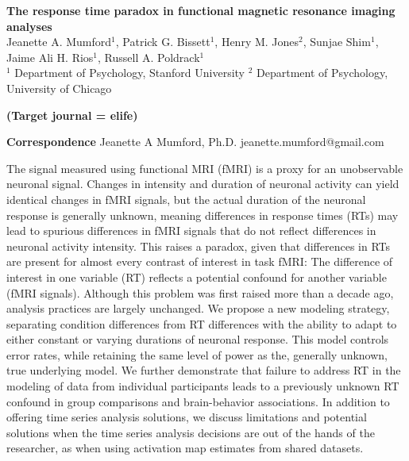 \documentclass[titlepage,12pt] {article}
\begin{document}
\begin{titlepage}
\begin{center}
{\large\textbf{The response time paradox in functional magnetic resonance imaging analyses
}}\\
{Jeanette A. Mumford$^1$, Patrick G. Bissett$^1$, Henry M. Jones$^2$, Sunjae Shim$^1$, Jaime Ali H. Rios$^1$, Russell A. Poldrack$^1$\\
  \small{$^1$} Department of Psychology, Stanford University 
  \small{$^2$} Department of Psychology, University of Chicago}
\end{center}


\textbf{(Target journal = elife)}

\vspace{2.8in}
\begin{singlespace}
  \hspace{0.1in}\newline
\textbf{Correspondence}\newline 
Jeanette A Mumford, Ph.D. \newline 
jeanette.mumford@gmail.com \newline
\end{singlespace}

\newpage
{}


The signal measured using functional MRI (fMRI) is a proxy for an unobservable neuronal signal. Changes in intensity and duration of neuronal activity can yield identical changes in fMRI signals, but the actual duration of the neuronal response is generally unknown, meaning differences in response times (RTs) may lead to spurious differences in fMRI signals that do not reflect differences in neuronal activity intensity.  This raises a paradox, given that differences in RTs are present for almost every contrast of interest in task fMRI: The difference of interest in one variable (RT) reflects a potential confound for another variable (fMRI signals).  Although this problem was first raised more than a decade ago, analysis practices are largely unchanged.  We propose a new modeling strategy, separating condition differences from RT differences with the ability to adapt to either constant or varying durations of neuronal response.  This model controls error rates, while retaining the same level of power as the, generally unknown, true underlying model.  We further demonstrate that failure to address RT in the modeling of data from individual participants leads to a previously unknown RT confound in group comparisons and brain-behavior associations.  In addition to offering time series analysis solutions, we discuss limitations and potential solutions when the time series analysis decisions are out of the hands of the researcher, as when using activation map estimates from shared datasets.


\vspace{.1in}


\end{titlepage}
\end{document}
